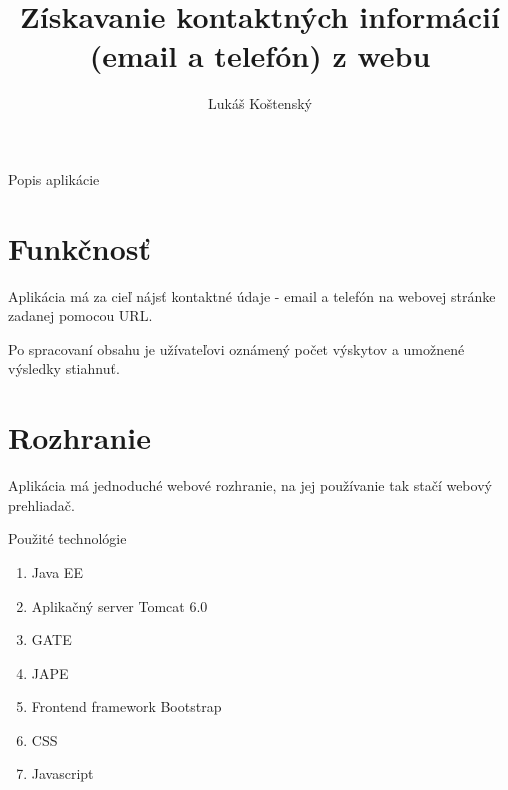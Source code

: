 \documentclass[11pt]{beamer}
\author{Lukáš Koštenský}
\title{Získavanie kontaktných informácií (email a telefón) z webu}
\institute{MI-DDW}
\begin{document}
\begin{frame}
\titlepage
\end{frame}


\begin{frame}{Popis aplikácie}
\section{Funkčnosť}
Aplikácia má za cieľ nájsť kontaktné údaje - email a telefón na webovej stránke zadanej pomocou URL.

Po spracovaní obsahu je užívateľovi oznámený počet výskytov a umožnené výsledky stiahnuť.
\section{Rozhranie}
Aplikácia má jednoduché webové rozhranie, na jej používanie tak stačí webový prehliadač.
\end{frame}
\begin{frame}{Použité technológie}
\begin{enumerate}
\item Java EE
\item Aplikačný server Tomcat 6.0
\item GATE
\item JAPE
\item Frontend framework Bootstrap
\item CSS
\item Javascript
\end{enumerate}
\end{frame}
\end{document}
